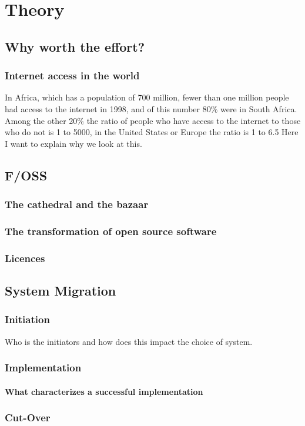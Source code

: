 \part{Theory}
\chapter{Why worth the effort?}
\section{Internet access in the world}
In Africa, which
has a population of 700 million, fewer than one million
people had access to the internet in 1998, and of this
number 80\% were in South Africa. Among the other
20\% the ratio of people who have access to the internet
to those who do not is 1 to 5000, in the United States
or Europe the ratio is 1 to 6.5 \cite{11}
Here I want to explain why we look at this.
\chapter{F/OSS}
\section{The cathedral and the bazaar \cite{10}}
\section{The transformation of open source software \cite{3}}
\section{Licences}
\chapter{System Migration \cite{2} \cite{8}}
\section{Initiation}
Who is the initiators and how does this impact the choice of system.
\section{Implementation}
\subsection{What characterizes a successful implementation}
\section{Cut-Over}
